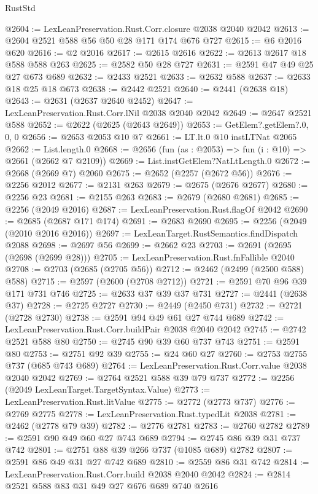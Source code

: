 \begin{lexlean}{RustStd}
\begin{coremodule}
@2604 := LexLeanPreservation.Rust.Corr.closure @2038 @2040 @2042
@2613 := @2604 @2521 @588 @56 @50 @28 @171 @174 @676 @727
@2615 := @6 @2016 @620
@2616 := @2 @2016
@2617 := @2615 @2616
@2622 := @2613 @2617 @18 @588 @588 @263
@2625 := @2582 @50 @28 @727
@2631 := @2591 @47 @49 @25 @27 @673 @689
@2632 := @2433 @2521
@2633 := @2632 @588
@2637 := @2633 @18 @25 @18 @673
@2638 := @2442 @2521
@2640 := @2441 (@2638 @18)
@2643 := @2631 (@2637 @2640 @2452)
@2647 := LexLeanPreservation.Rust.Corr.lNil @2038 @2040 @2042
@2649 := @2647 @2521 @588
@2652 := @2622 (@2625 (@2643 @2649))
@2653 := GetElem?.getElem?.{0, 0, 0}
@2656 := @2653 @2053 @10 @7
@2661 := LT.lt.{0} @10 instLTNat @2065
@2662 := List.length.{0}
@2668 := @2656 (fun (as : @2053) => fun (i : @10) => @2661 (@2662 @7 @2109))
@2669 := List.instGetElem?NatLtLength.{0}
@2672 := @2668 (@2669 @7) @2060
@2675 := @2652 (@2257 (@2672 @56))
@2676 := @2256 @2012
@2677 := @2131 @263
@2679 := @2675 (@2676 @2677)
@2680 := @2256 @23
@2681 := @2155 @263
@2683 := @2679 (@2680 @2681)
@2685 := @2256 (@2049 @2016)
@2687 := LexLeanPreservation.Rust.flagOf @2042
@2690 := @2685 (@2687 @171 @174)
@2691 := @2683 @2690
@2695 := @2256 (@2049 (@2010 @2016 @2016))
@2697 := LexLeanTarget.RustSemantics.findDispatch @2088
@2698 := @2697 @56
@2699 := @2662 @23
@2703 := @2691 (@2695 (@2698 (@2699 @28)))
@2705 := LexLeanPreservation.Rust.fnFallible @2040
@2708 := @2703 (@2685 (@2705 @56))
@2712 := @2462 (@2499 (@2500 @588) @588)
@2715 := @2597 (@2600 (@2708 @2712))
@2721 := @2591 @70 @96 @39 @171 @731 @746
@2725 := @2633 @37 @39 @37 @731
@2727 := @2441 (@2638 @37)
@2728 := @2725 @2727
@2730 := @2449 (@2450 @731)
@2732 := @2721 (@2728 @2730)
@2738 := @2591 @94 @49 @61 @27 @744 @689
@2742 := LexLeanPreservation.Rust.Corr.buildPair @2038 @2040 @2042
@2745 := @2742 @2521 @588 @80
@2750 := @2745 @90 @39 @60 @737 @743
@2751 := @2591 @80
@2753 := @2751 @92 @39
@2755 := @24 @60 @27
@2760 := @2753 @2755 @737 (@685 @743 @689)
@2764 := LexLeanPreservation.Rust.Corr.value @2038 @2040 @2042
@2769 := @2764 @2521 @588 @39 @79 @737
@2772 := @2256 (@2049 LexLeanTarget.TargetSyntax.Value)
@2773 := LexLeanPreservation.Rust.litValue
@2775 := @2772 (@2773 @737)
@2776 := @2769 @2775
@2778 := LexLeanPreservation.Rust.typedLit @2038
@2781 := @2462 (@2778 @79 @39)
@2782 := @2776 @2781
@2783 := @2760 @2782
@2789 := @2591 @90 @49 @60 @27 @743 @689
@2794 := @2745 @86 @39 @31 @737 @742
@2801 := @2751 @88 @39 @266 @737 (@1085 @689) @2782
@2807 := @2591 @86 @49 @31 @27 @742 @689
@2810 := @2559 @86 @31 @742
@2814 := LexLeanPreservation.Rust.Corr.build @2038 @2040 @2042
@2824 := @2814 @2521 @588 @83 @31 @49 @27 @676 @689 @740 @2616

\end{coremodule}
\end{lexlean}
